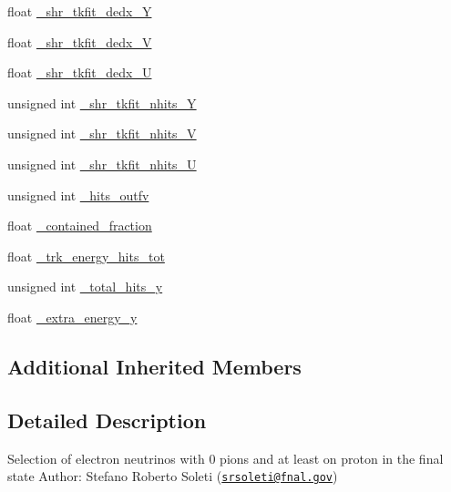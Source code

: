 \begin{DoxyCompactItemize}
\item 
float \hyperlink{classselection_1_1CC0piNpSelection_ababbbc32babdef645c2edc613713ceb7}{\-\_\-shr\-\_\-tkfit\-\_\-dedx\-\_\-\-Y}
\item 
float \hyperlink{classselection_1_1CC0piNpSelection_a428fc549513bea0e1ca92cf90c1148cd}{\-\_\-shr\-\_\-tkfit\-\_\-dedx\-\_\-\-V}
\item 
float \hyperlink{classselection_1_1CC0piNpSelection_aaaef69409457695e2300bf847a13804c}{\-\_\-shr\-\_\-tkfit\-\_\-dedx\-\_\-\-U}
\item 
unsigned int \hyperlink{classselection_1_1CC0piNpSelection_ae3a53326b19594013c9df08b66ccaa73}{\-\_\-shr\-\_\-tkfit\-\_\-nhits\-\_\-\-Y}
\item 
unsigned int \hyperlink{classselection_1_1CC0piNpSelection_adab23c54dd799cdf83c31a10e4ae9061}{\-\_\-shr\-\_\-tkfit\-\_\-nhits\-\_\-\-V}
\item 
unsigned int \hyperlink{classselection_1_1CC0piNpSelection_a6c75f5783174133ce97849f128f3dee3}{\-\_\-shr\-\_\-tkfit\-\_\-nhits\-\_\-\-U}
\item 
unsigned int \hyperlink{classselection_1_1CC0piNpSelection_ac39ec79d190fb925f8d20b03cbeb0605}{\-\_\-hits\-\_\-outfv}
\item 
float \hyperlink{classselection_1_1CC0piNpSelection_a8e7933222bce1424aee24bae8dcf4864}{\-\_\-contained\-\_\-fraction}
\item 
float \hyperlink{classselection_1_1CC0piNpSelection_a82a48c6128c34252642d237b98f1b66a}{\-\_\-trk\-\_\-energy\-\_\-hits\-\_\-tot}
\item 
unsigned int \hyperlink{classselection_1_1CC0piNpSelection_a819d1d973e74bcd2ad82aa01ea24ac37}{\-\_\-total\-\_\-hits\-\_\-y}
\item 
float \hyperlink{classselection_1_1CC0piNpSelection_a2e386c361ecc27d22ff2642e80a629e4}{\-\_\-extra\-\_\-energy\-\_\-y}
\end{DoxyCompactItemize}
\subsection*{Additional Inherited Members}


\subsection{Detailed Description}
Selection of electron neutrinos with 0 pions and at least on proton in the final state Author\-: Stefano Roberto Soleti (\href{mailto:srsoleti@fnal.gov}{\tt srsoleti@fnal.\-gov}) 

